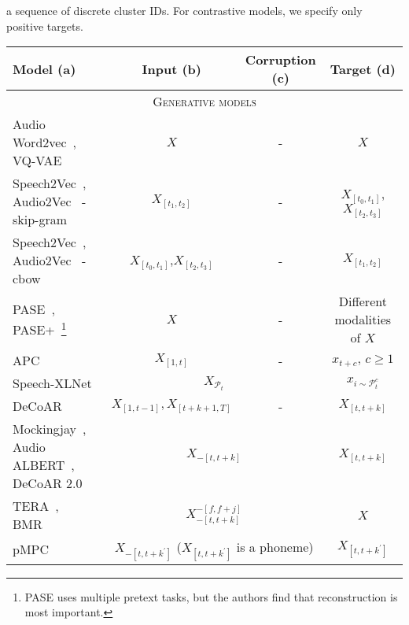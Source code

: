 \begin{table*}[!htb]
{    a sequence of discrete cluster IDs.
    For contrastive models, we specify only positive targets.
    }
\centering
\renewcommand*\arraystretch{1.2}{
\begin{tabular}{l|c|c|c}
    \toprule
    \textbf{Model} (a) & \textbf{Input} (b) & \textbf{Corruption} (c) & \textbf{Target} (d) \\
    \midrule
    \midrule
    \multicolumn{4}{c}{\textsc{Generative models}} \\
    \midrule
    \midrule
    Audio Word2vec~\cite{chung_audio_2016}, VQ-VAE~\cite{oord_neural_2018}     & $X$ &   \textsc{-}    &  $X$  \\ %
    \midrule  
    Speech2Vec~\cite{chung_speech2vec_2018}, Audio2Vec~\cite{tagliasacchi_pre_2020} - skip-gram    & $X_{[t_1,t_2]}$  &     \textsc{-}   &    $X_{[t_0,t_1]}$,$X_{[t_2,t_3]}$     \\
    \midrule 
    Speech2Vec~\cite{chung_speech2vec_2018}, Audio2Vec~\cite{tagliasacchi_pre_2020} - cbow    & $X_{[t_0,t_1]}$,$X_{[t_2,t_3]}$   &     \textsc{-}   &    $X_{[t_1,t_2]}$   \\
    \midrule 
    PASE~\cite{pascual_learning_2019}, PASE+~\cite{ravanelli_multi_2020}\footnote{PASE uses multiple pretext tasks, but the authors find that reconstruction is most important.}       & $X$ &  \textsc{-}   &  Different modalities of $X$  \\
    \midrule 
    APC~\cite{chung_unsupervised_2019,chung_vector-quantized_2020}         & $X_{[1,t]}$   & \textsc{-}              & $x_{t+c},\, c\geq1$    \\ %
    \midrule
    Speech-XLNet \cite{song20d_interspeech}     & \multicolumn{2}{c|}{$X_{\mathcal{P}_{t}}$}   &     $x_{i\sim\mathcal{P}^c_{t}}$  \\ %
    \midrule  
    DeCoAR~\cite{ling2020deep}     & $X_{[1,t-1]}, X_{[t+k+1,T]}$ & \textsc{-} & $X_{[t,t+k]}$   \\
    \midrule
    Mockingjay~\cite{liu_mockingjay_2020}, Audio ALBERT~\cite{chi2020audio}, DeCoAR 2.0~\cite{ling2020decoar}   & \multicolumn{2}{c|}{$X_{-[t,t+k]}$}   & $X_{[t,t+k]}$    \\
    \midrule 
    TERA~\cite{liu_tera_2021}, BMR~\cite{wang_unsupervised_2020}  & \multicolumn{2}{c|}{$X_{-[t,t+k]}^{-[f,f+j]}$}       & $X$       \\
    \midrule
    pMPC~\cite{yue_pmpc_2021}      &  \multicolumn{2}{c|}{$X_{-[t,t+k^\prime]}$ ($X_{[t,t+k^\prime]}$ is a phoneme)}       & $X_{[t,t+k^\prime]}$    \\

\end{tabular}}
\end{table*}
